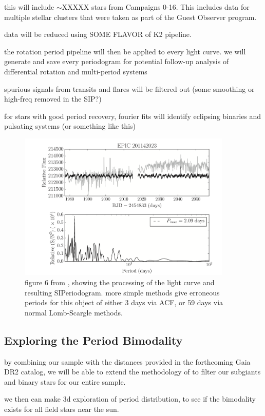 \documentclass[12pt]{article}
\begin{document}
this will include $\sim$XXXXX stars from Campaigns 0-16. This includes data for multiple stellar clusters that were taken as part of the Guest Observer program.

data will be reduced using SOME FLAVOR of K2 pipeline.


the \citet{angus2016} rotation period pipeline will then be applied to every light curve. we will generate and save every periodogram for potential follow-up analysis of differential rotation and multi-period systems

spurious signals from transits and flares will be filtered out (some smoothing or high-freq removed in the SIP?)

for stars with good period recovery, fourier fits will identify eclipsing binaries and pulsating systems (or something like this)


\begin{figure}[!th]
\centering
\includegraphics[width=4in]{angus2016_fig6.png}
\caption{
figure 6 from \citet{angus2016}, showing the processing of the light curve and resulting SIPeriodogram. more simple methods give erroneous periods for this object of either 3 days via ACF, or 59 days via normal Lomb-Scargle methods.
}
\label{fig:sip}
\end{figure}




\subsection{Exploring the Period Bimodality}
by combining our sample with the distances provided in the forthcoming Gaia DR2 catalog, we will be able to extend the methodology of \citet{davenport2017} to filter our subgiants and binary stars for our entire sample.

we then can make 3d exploration of period distribution, to see if the bimodality exists for all field stars near the sun.
\end{document}
